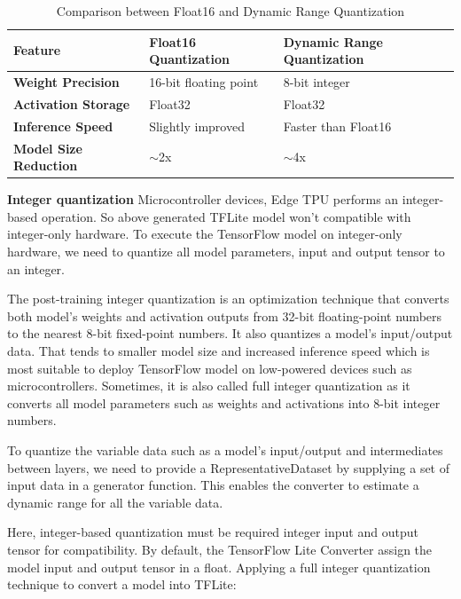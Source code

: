 	\begin{table}[h!]
		\centering
		\begin{tabular}{|l|l|l|}
			\hline
			\textbf{Feature} & \textbf{Float16 Quantization} & \textbf{Dynamic Range Quantization} \\
			\hline
			\textbf{Weight Precision} & 16-bit floating point & 8-bit integer \\
			\hline
			\textbf{Activation Storage} & Float32 & Float32 \\
			\hline
			\textbf{Inference Speed} & Slightly improved & Faster than Float16 \\
			\hline
			\textbf{Model Size Reduction} & $\sim$2x & $\sim$4x \\
			\hline
		\end{tabular}
		\caption{Comparison between Float16 and Dynamic Range Quantization}
	\end{table}
	\textbf{Integer quantization}
	Microcontroller devices, Edge TPU performs an integer-based operation. So above generated TFLite model won’t compatible with integer-only hardware. To execute the TensorFlow model on integer-only hardware, we need to quantize all model parameters, input and output tensor to an integer.\cite{tensorflowlite:2025}
	
	The post-training integer quantization is an optimization technique that converts both model’s weights and activation outputs from 32-bit floating-point numbers to the nearest 8-bit fixed-point numbers. It also quantizes a model’s input/output data. That tends to smaller model size and increased inference speed which is most suitable to deploy TensorFlow model on low-powered devices such as microcontrollers. Sometimes, it is also called full integer quantization as it converts all model parameters such as weights and activations into 8-bit integer numbers.\cite{tensorflowlite:2025}
	
	To quantize the variable data such as a model’s input/output and intermediates between layers, we need to provide a RepresentativeDataset by supplying a set of input data in a generator function. This enables the converter to estimate a dynamic range for all the variable data.\cite{tensorflowlite:2025}
	
	Here, integer-based quantization must be required integer input and output tensor for compatibility. By default, the TensorFlow Lite Converter assign the model input and output tensor in a float. Applying a full integer quantization technique to convert a model into TFLite:

